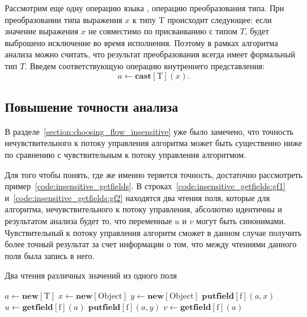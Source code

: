 \documentclass[14pt,titlepage,draft]{extarticle}
\newcommand{\java}{\eng{Java}\xspace}
\newcommand{\type}[1]{\mathrm{#1}}
\newcommand{\field}[1]{\mathrm{#1}}
\newcommand{\op}[1]{\mathbf{#1}}
\begin{document}
    Рассмотрим еще одну операцию языка \java, операцию преобразования типа. При
    преобразовании типа выражения $x$ к типу $\type{T}$ происходит следующее:
    если значение выражения $x$ не совместимо по присваиванию с типом $T$,
    будет выброшено исключение во время исполнения.
    Поэтому в рамках алгоритма анализа можно считать, что результат
    преобразования всегда имеет формальный тип $T$.
    Введем соответствующую операцию внутреннего представления:
    \[ a \gets \op{cast}[\type{T}](x). \]

  \subsection{Повышение точности анализа}
    \label{section:increase_accuracy}

    В разделе~\ref{section:choosing_flow_insensitive} уже было замечено, что
    точность нечувствительного к потоку управления алгоритма может быть
    существенно ниже по сравнению с чувствительным к потоку управления
    алгоритмом.

    Для того чтобы понять, где же именно теряется точность, достаточно
    рассмотреть пример~\ref{code:insensitive_getfields}. В
    строках~\ref{code:insensitive_getfields:gf1}
    и~\ref{code:insensitive_getfields:gf2} находятся два чтения поля, которые
    для алгоритма, нечувствительного к потоку управления, абсолютно идентичны и
    результатом анализа будет то, что переменные $u$ и $v$ могут быть
    синонимами. Чувствительный к потоку управления алгоритм сможет в данном
    случае получить более точный результат за счет информации о том, что между
    чтениями данного поля была запись в него.

    \begin{algorithm}
      \caption{Два чтения различных значений из одного поля}
      \label{code:insensitive_getfields}
      \begin{algorithmic}[1]
        \State $a \gets \op{new}[\type{T}]$
        \State $x \gets \op{new}[\type{Object}]$
        \State $y \gets \op{new}[\type{Object}]$
        \State $\op{putfield}[\field{f}](a, x)$
        \State $u \gets \op{getfield}[\field{f}](a)$
          \label{code:insensitive_getfields:gf1}
        \State $\op{putfield}[\field{f}](a, y)$
        \State $v \gets \op{getfield}[\field{f}](a)$
          \label{code:insensitive_getfields:gf2}
      \end{algorithmic}
    \end{algorithm}
\end{document}

